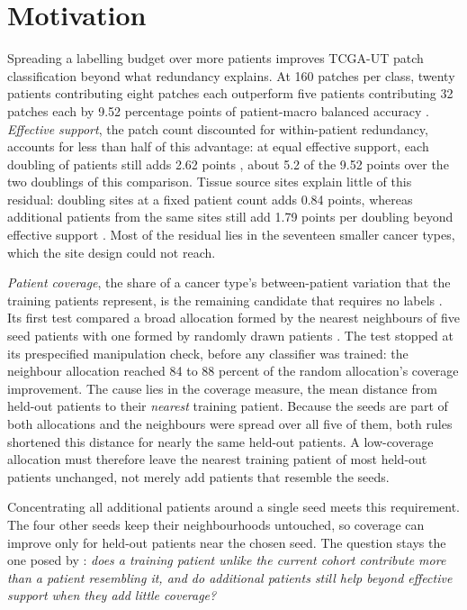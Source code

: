 \documentclass[11pt]{article}
\begin{document}
\setcounter{tocdepth}{1}
\tableofcontents
\clearpage

\section{Motivation}
\label{sec:motivation}
Spreading a labelling budget over more patients improves TCGA-UT patch classification beyond what redundancy explains. At 160 patches per class, twenty patients contributing eight patches each outperform five patients contributing 32 patches each by 9.52 percentage points of patient-macro balanced accuracy \citep{queisler2026effectiveSupport}. \emph{Effective support}, the patch count discounted for within-patient redundancy, accounts for less than half of this advantage: at equal effective support, each doubling of patients still adds 2.62 points \citep{queisler2026multidirectionalRedundancy}, about 5.2 of the 9.52 points over the two doublings of this comparison. Tissue source sites explain little of this residual: doubling sites at a fixed patient count adds 0.84 points, whereas additional patients from the same sites still add 1.79 points per doubling beyond effective support \citep{queisler2026siteCoverage}. Most of the residual lies in the seventeen smaller cancer types, which the site design could not reach.

\emph{Patient coverage}, the share of a cancer type's between-patient variation that the training patients represent, is the remaining candidate that requires no labels \citep{komura2022universalEncoding}. Its first test compared a broad allocation formed by the nearest neighbours of five seed patients with one formed by randomly drawn patients \citep{queisler2026patientCoverage}. The test stopped at its prespecified manipulation check, before any classifier was trained: the neighbour allocation reached 84 to 88 percent of the random allocation's coverage improvement. The cause lies in the coverage measure, the mean distance from held-out patients to their \emph{nearest} training patient. Because the seeds are part of both allocations and the neighbours were spread over all five of them, both rules shortened this distance for nearly the same held-out patients. A low-coverage allocation must therefore leave the nearest training patient of most held-out patients unchanged, not merely add patients that resemble the seeds.

Concentrating all additional patients around a single seed meets this requirement. The four other seeds keep their neighbourhoods untouched, so coverage can improve only for held-out patients near the chosen seed. The question stays the one posed by \citet{queisler2026patientCoverage}: \emph{does a training patient unlike the current cohort contribute more than a patient resembling it, and do additional patients still help beyond effective support when they add little coverage?}
\end{document}
